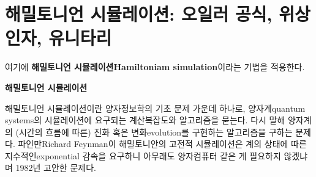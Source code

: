 \documentclass[a4paper,atbegshi,chapter,itemph,hidelinks]{oblivoir}
\begin{document}
\section{해밀토니언 시뮬레이션: 오일러 공식, 위상 인자, 유니타리}
여기에 \textbf{해밀토니언 시뮬레이션\tiny Hamiltoniam simulation}이라는 기법을
적용한다.
\begin{mdframed}
  \begin{center}\textbf{해밀토니언 시뮬레이션}\end{center}\noindent
  해밀토니언 시뮬레이션이란 양자정보학의 기초 문제 가운데 하나로, 
  양자계{\footnotesize quantum systems}의 시뮬레이션에 요구되는 계산복잡도와
  알고리즘을 묻는다. 다시 말해 양자계의 (시간의 흐름에 따른) 진화 혹은
  변화{\footnotesize evolution}를 구현하는 알고리즘을 구하는 문제다. 
  파인만{\footnotesize Richard Feynman}이 해밀토니안의 고전적 시뮬레이션은 
  계의 상태에 따른 지수적인{\footnotesize exponential} 감속을 요구하니
  아무래도 양자컴퓨터 같은 게 필요하지 않겠냐며 1982년 고안한 문제다.


\end{mdframed}
\end{document}
